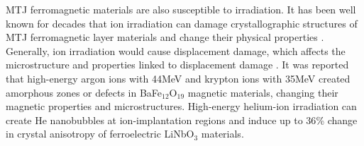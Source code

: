 \documentclass[molecules,review,submit,pdftex,moreauthors]{Definitions/mdpi}
\begin{document}


MTJ ferromagnetic materials are also susceptible to irradiation.  It has been well known for decades that ion irradiation can damage crystallographic structures of MTJ ferromagnetic layer materials and change their physical properties \cite{Gordon1964IEEE}.  Generally, ion irradiation would cause displacement damage, which affects the microstructure and properties linked to displacement damage \cite{Lu2015JMR}.  It was reported that high-energy argon ions with \unit{44}{MeV} and krypton ions with \unit{35}{MeV} created amorphous zones \cite{Groult1985RE} or defects \cite{Chukalkin1981PSSa} in BaFe$_{12}$O$_{19}$ magnetic materials, changing their magnetic properties and microstructures.   High-energy helium-ion irradiation can create He nanobubbles at ion-implantation regions \cite{Ofan2011PRB} and induce up to \unit{36}{\%} change in  crystal anisotropy \cite{Huang2013OME} of ferroelectric LiNbO$_3$ materials.  
\end{document}
